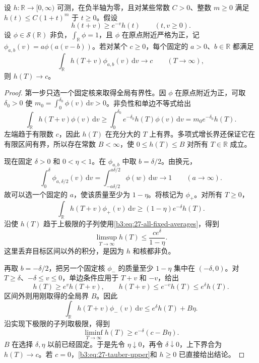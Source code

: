 \begin{lemma}[由单调累积量撤去平均]
\label{b3:lem:27-monotone-unsmoothing}
设 \(h:\mathbb R\to[0,\infty)\) 可测，在负半轴为零，且对某些常数 \(C>0\)、整数 \(m\ge0\) 满足 \(h(t)\le C(1+t)^m\) 于 \(t\ge0\)。假设
\[
 h(t+v)\ge e^{-v}h(t)\qquad(t,v\ge0).
\]
设 \(\phi\in\mathcal S(\mathbb R)\) 非负，\(\int_{\mathbb R}\phi=1\)，且 \(\phi\) 在原点附近严格为正，记 \(\phi_{a,b}(v)=a\phi(a(v-b))\)。若对某个 \(c\ge0\)，每个固定的 \(a>0\)、\(b\in\mathbb R\) 都满足
\begin{equation}
\label{b3:eq:27-all-fixed-averages}
 \int_{\mathbb R}h(T+v)\phi_{a,b}(v)\,\mathrm dv
 \longrightarrow c\qquad(T\to\infty),
\end{equation}
则 \(h(T)\to c\)。
\end{lemma}
\begin{proof}
第一步只选一个固定核来取得全局有界性。因 \(\phi\) 在原点附近为正，可取 \(\delta_0>0\) 使
\(m_0=\int_0^{\delta_0}\phi(v)\,\mathrm dv>0\)。非负性和单边不等式给出
\[
 \int_{\mathbb R}h(T+v)\phi(v)\,\mathrm dv
 \ge\int_0^{\delta_0}e^{-\delta_0}h(T)\phi(v)\,\mathrm dv
 =m_0e^{-\delta_0}h(T).
\]
左端趋于有限数 \(c\)，因此 \(h(T)\) 在充分大的 \(T\) 上有界。多项式增长界还保证它在有限区间有界，所以存在常数 \(B<\infty\)，使 \(0\le h(T)\le B\) 对所有 \(T\in\mathbb R\) 成立。

现在固定 \(\delta>0\) 和 \(0<\eta<1\)。在 \(\phi_{a,b}\) 中取 \(b=\delta/2\)。由换元，
\[
 \int_0^\delta\phi_{a,\delta/2}(v)\,\mathrm dv
 =\int_{-a\delta/2}^{a\delta/2}\phi(w)\,\mathrm dw
 \longrightarrow1\qquad(a\to\infty).
\]
故可以选一个固定的 \(a\)，使该质量至少为 \(1-\eta\)。将核记为 \(\phi_+\)。对所有 \(T\ge0\)，
\[
 \int_{\mathbb R}h(T+v)\phi_+(v)\,\mathrm dv
 \ge(1-\eta)e^{-\delta}h(T).
\]
沿使 \(h(T)\) 趋于上极限的子列使用\eqref{b3:eq:27-all-fixed-averages}，得到
\begin{equation}
\label{b3:eq:27-tauber-upper}
 \limsup_{T\to\infty}h(T)
 \le\frac{ce^\delta}{1-\eta}.
\end{equation}
这里丢弃目标区间以外的积分，是因为 \(h\) 和核都非负。

再取 \(b=-\delta/2\)，把另一个固定核 \(\phi_-\) 的质量至少 \(1-\eta\) 集中在 \((-\delta,0)\)。对 \(T\ge\delta\)、\(-\delta\le v\le0\)，单边条件应用于 \(T+v\) 和 \(-v\)，给出
\[
 h(T)\ge e^v h(T+v),\qquad
 h(T+v)\le e^{-v}h(T)\le e^\delta h(T).
\]
区间外则用刚取得的全局界 \(B\)。因此
\[
 \int_{\mathbb R}h(T+v)\phi_-(v)\,\mathrm dv
 \le e^\delta h(T)+B\eta.
\]
沿实现下极限的子列取极限，得到
\begin{equation}
\label{b3:eq:27-tauber-lower}
 \liminf_{T\to\infty}h(T)\ge e^{-\delta}(c-B\eta).
\end{equation}
\(B\) 在选择 \(\delta,\eta\) 以前已经固定。于是先令 \(\eta\downarrow0\)，再令 \(\delta\downarrow0\)，上下界合为 \(h(T)\to c\)。若 \(c=0\)，\eqref{b3:eq:27-tauber-upper}和 \(h\ge0\) 已直接给出结论。
\end{proof}

